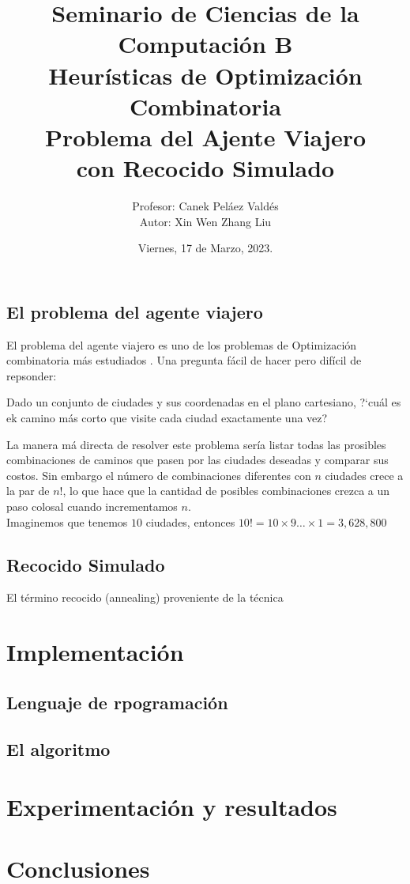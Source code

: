 \documentclass[a4paper]{article}
\title { \Large{Seminario de Ciencias de la Computaci\'on B}\protect\\
  \large{Heurísticas de Optimización Combinatoria}\protect\\
  \large{Problema del Ajente Viajero\\con Recocido Simulado}}
\date{\normalsize{Viernes, 17 de Marzo, 2023.}}
\author{\normalsize{Profesor: Canek Peláez Valdés}\protect\\
  \normalsize{Autor: Xin Wen Zhang Liu}}\vspace{0.2cm}
\begin{document}
\allowdisplaybreaks
\maketitle

\subsection*{El problema del agente viajero}
El problema del agente viajero es uno de los problemas de Optimización combinatoria m\'as estudiados . Una pregunta f\'acil de hacer pero dif\'icil de repsonder:
\begin{center}
  Dado un conjunto de ciudades y sus coordenadas en el plano cartesiano, ?`cu\'al es ek camino m\'as corto que visite cada ciudad exactamente una vez?
\end{center}
La manera m\'a directa de resolver este problema ser\'ia listar todas las prosibles combinaciones de caminos que pasen por las ciudades deseadas y comparar sus costos. Sin embargo el n\'umero de combinaciones diferentes con $n$ ciudades crece a la par de  $n!$, lo que hace que la cantidad de posibles combinaciones crezca a un paso colosal cuando incrementamos $n$.\\

Imaginemos que tenemos $10$ ciudades, entonces $10! = 10 \times 9 \dots \times 1 = 3,628,800$



\subsection*{Recocido Simulado}
El t\'ermino recocido (annealing) proveniente de la t\'ecnica 
\section*{Implementaci\'on}
\subsection*{Lenguaje de rpogramaci\'on}
\subsection*{El algoritmo}

\section*{Experimentaci\'on y resultados}

\section*{Conclusiones}
\end{document}
